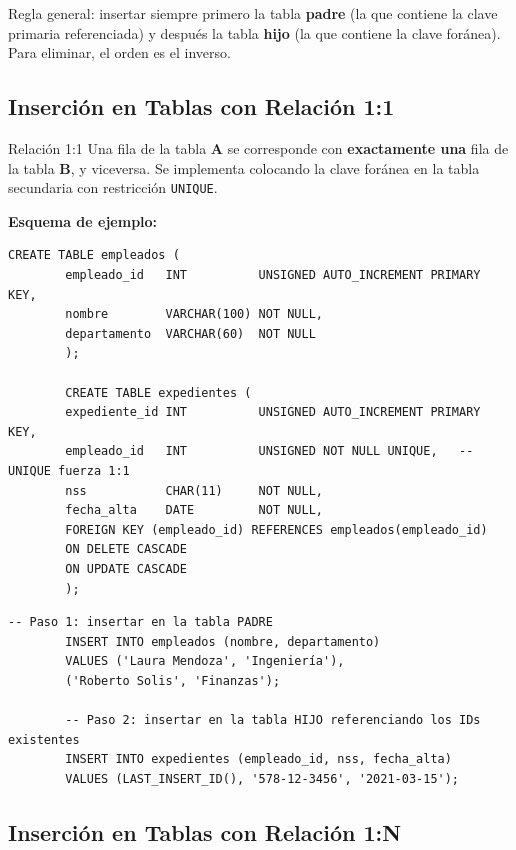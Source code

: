 \documentclass[12pt, a4paper]{article}
\begin{document}
	\begin{nota}
		Regla general: insertar siempre primero la tabla \textbf{padre} (la que
		contiene la clave primaria referenciada) y después la tabla \textbf{hijo}
		(la que contiene la clave foránea). Para eliminar, el orden es el inverso.
	\end{nota}
	
	\subsection{Inserción en Tablas con Relación 1:1}
	
	\begin{definicion}{Relación 1:1}
		Una fila de la tabla \textbf{A} se corresponde con \textbf{exactamente una}
		fila de la tabla \textbf{B}, y viceversa. Se implementa colocando la clave
		foránea en la tabla secundaria con restricción \texttt{UNIQUE}.
	\end{definicion}
	
	\textbf{Esquema de ejemplo:}
	
	\begin{lstlisting}[style=sql, caption={Tablas con relación 1:1 — empleado y expediente}]
		CREATE TABLE empleados (
		empleado_id   INT          UNSIGNED AUTO_INCREMENT PRIMARY KEY,
		nombre        VARCHAR(100) NOT NULL,
		departamento  VARCHAR(60)  NOT NULL
		);
		
		CREATE TABLE expedientes (
		expediente_id INT          UNSIGNED AUTO_INCREMENT PRIMARY KEY,
		empleado_id   INT          UNSIGNED NOT NULL UNIQUE,   -- UNIQUE fuerza 1:1
		nss           CHAR(11)     NOT NULL,
		fecha_alta    DATE         NOT NULL,
		FOREIGN KEY (empleado_id) REFERENCES empleados(empleado_id)
		ON DELETE CASCADE
		ON UPDATE CASCADE
		);
	\end{lstlisting}
	
	\begin{lstlisting}[style=sql, caption={Inserción respetando integridad referencial 1:1}]
		-- Paso 1: insertar en la tabla PADRE
		INSERT INTO empleados (nombre, departamento)
		VALUES ('Laura Mendoza', 'Ingeniería'),
		('Roberto Solis', 'Finanzas');
		
		-- Paso 2: insertar en la tabla HIJO referenciando los IDs existentes
		INSERT INTO expedientes (empleado_id, nss, fecha_alta)
		VALUES (LAST_INSERT_ID(), '578-12-3456', '2021-03-15');
	\end{lstlisting}
	
	\subsection{Inserción en Tablas con Relación 1:N}
	
\end{document}
